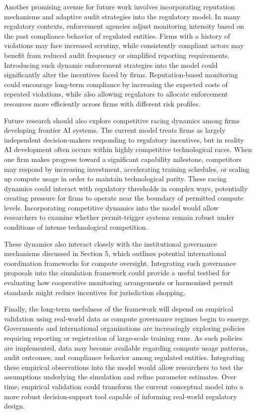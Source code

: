 Another promising avenue for future work involves incorporating reputation mechanisms and adaptive audit strategies into the regulatory model. In many regulatory contexts, enforcement agencies adjust monitoring intensity based on the past compliance behavior of regulated entities. Firms with a history of violations may face increased scrutiny, while consistently compliant actors may benefit from reduced audit frequency or simplified reporting requirements. Introducing such dynamic enforcement strategies into the model could significantly alter the incentives faced by firms. Reputation-based monitoring could encourage long-term compliance by increasing the expected costs of repeated violations, while also allowing regulators to allocate enforcement resources more efficiently across firms with different risk profiles.

Future research should also explore competitive racing dynamics among firms developing frontier AI systems. The current model treats firms as largely independent decision-makers responding to regulatory incentives, but in reality AI development often occurs within highly competitive technological races. When one firm makes progress toward a significant capability milestone, competitors may respond by increasing investment, accelerating training schedules, or scaling up compute usage in order to maintain technological parity. These racing dynamics could interact with regulatory thresholds in complex ways, potentially creating pressure for firms to operate near the boundary of permitted compute levels. Incorporating competitive dynamics into the model would allow researchers to examine whether permit-trigger systems remain robust under conditions of intense technological competition.

These dynamics also interact closely with the institutional governance mechanisms discussed in Section 5, which outlines potential international coordination frameworks for compute oversight. Integrating such governance proposals into the simulation framework could provide a useful testbed for evaluating how cooperative monitoring arrangements or harmonized permit standards might reduce incentives for jurisdiction shopping.

Finally, the long-term usefulness of the framework will depend on empirical validation using real-world data as compute governance regimes begin to emerge. Governments and international organizations are increasingly exploring policies requiring reporting or registration of large-scale training runs. As such policies are implemented, data may become available regarding compute usage patterns, audit outcomes, and compliance behavior among regulated entities. Integrating these empirical observations into the model would allow researchers to test the assumptions underlying the simulation and refine parameter estimates. Over time, empirical validation could transform the current conceptual model into a more robust decision-support tool capable of informing real-world regulatory design.

 